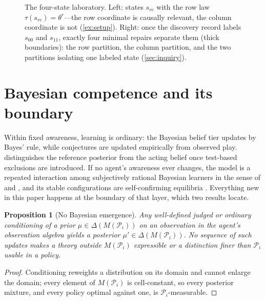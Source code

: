 \documentclass[11pt]{article}
\newtheorem{proposition}[assumption]{Proposition}
\theoremstyle{definition}
\begin{document}
\begin{figure}[t]
\caption{The four-state laboratory.
Left: states $s_{rc}$ with the row law $\tau(s_{rc})=\theta^{r}$---the row coordinate is causally relevant, the column coordinate is not (\cref{ex:setup}).
Right: once the discovery record labels $s_{00}$ and $s_{11}$, exactly four minimal repairs separate them (thick boundaries): the row partition, the column partition, and the two partitions isolating one labeled state (\cref{sec:inquiry}).}
\label{fig:example-array}
\end{figure}
\section{Bayesian competence and its boundary}
\label{sec:bayesian}

Within fixed awareness, learning is ordinary: the Bayesian belief tier updates by Bayes' rule, while conjectures are updated empirically from observed play.
 distinguishes the reference posterior from the acting belief once test-based exclusions are introduced.
If no agent's awareness ever changes, the model is a repeated interaction among subjectively rational Bayesian learners in the sense of \citet{KalaiLehrer1993b} and \citet{Ryall2003}, and its stable configurations are self-confirming equilibria \citep{FudenbergLevine1993}.
Everything new in this paper happens at the boundary of that layer, which two results locate.

\begin{proposition}[No Bayesian emergence]
\label{prop:no-emergence}
Any well-defined judged or ordinary conditioning of a prior $\mu\in\Delta(M(\mathcal P_i))$ on an observation in the agent's observation algebra yields a posterior $\mu'\in\Delta(M(\mathcal P_i))$.
No sequence of such updates makes a theory outside $M(\mathcal P_i)$ expressible or a distinction finer than $\mathcal P_i$ usable in a policy.
\end{proposition}

\begin{proof}
Conditioning reweights a distribution on its domain and cannot enlarge the domain; every element of $M(\mathcal P_i)$ is cell-constant, so every posterior mixture, and every policy optimal against one, is $\mathcal P_i$-measurable.
\end{proof}
\end{document}
